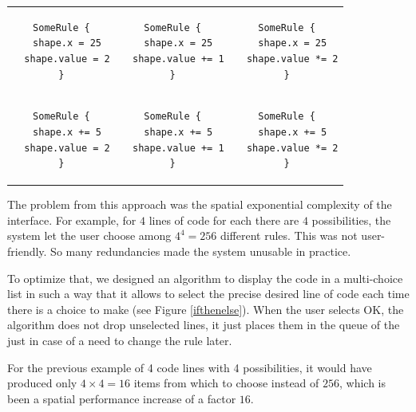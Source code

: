 \documentclass[12pt]{article} %
\begin{document}
\begin{center}
\begin{tabular}{c c c}
\begin{lstlisting}[linewidth=3.6cm]
SomeRule {
  shape.x = 25
  shape.value = 2
}
\end{lstlisting}
&
\begin{lstlisting}[linewidth=3.8cm]
SomeRule {
  shape.x = 25
  shape.value += 1
}
\end{lstlisting}
&
\begin{lstlisting}[linewidth=3.6cm]
SomeRule {
  shape.x = 25
  shape.value *= 2
}
\end{lstlisting}
\\[1cm]
\begin{lstlisting}[linewidth=3.6cm]
SomeRule {
  shape.x += 5
  shape.value = 2
}
\end{lstlisting}
&
\begin{lstlisting}[linewidth=3.8cm]
SomeRule {
  shape.x += 5
  shape.value += 1
}
\end{lstlisting}
&
\begin{lstlisting}[linewidth=3.6cm]
SomeRule {
  shape.x += 5
  shape.value *= 2
}
\end{lstlisting}
\end{tabular}
\end{center}

The problem from this approach was the spatial exponential complexity of the
interface. For example, for $4$ lines of code for each there are $4$
possibilities, the system let the user choose among $4^4 = 256$ different
rules. This was not user-friendly. So many redundancies made the system 
unusable in practice.

To optimize that, we designed an algorithm to display the code in a
multi-choice list in such a way that it allows to select the precise desired
line of code each time there is a choice to make (see Figure \ref{ifthenelse}).
When the user selects OK, the algorithm does not drop unselected lines, it just
places them in the queue of the \pp{} just in case of a need to change the rule
later.

For the previous example of 4 code lines with 4 possibilities, it would
have produced only $4\times4 = 16$ items from which to choose instead of $256$,
which is been a spatial performance increase of a factor $16$.
\end{document}
